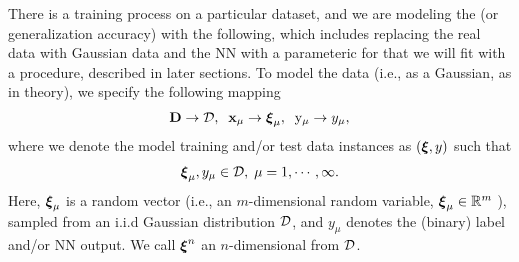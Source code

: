 There is a training process on a particular dataset, and we are modeling the \Quality (or generalization accuracy)
with the following, which includes replacing the real data with Gaussian data and
the NN with a parameteric for that we will fit with a \SemiEmpirical procedure, described in later sections.
To model the data (i.e., as a Gaussian, as in \SMOG theory), we specify the following mapping
\begin{align}
\label{eqn:model_real_world_expt}
  \mathbf{D} \rightarrow \mathcal{D},\;\;{\mathbf{x}}_{\mu} \rightarrow \boldsymbol{\xi}_{\mu},\;\;  \mathrm{y}_{\mu} \rightarrow y_{\mu}  ,
\end{align}
where we denote the model training and/or test data instances as $(\boldsymbol{\xi},y)$ such that
\begin{align}
    \label{eqn:xi}
  \boldsymbol{\xi}_{\mu}, y_{\mu} \in\mathcal{D},\;\mu=1, \cdots, \infty  .
\end{align}
Here,  $\boldsymbol{\xi}_{\mu}$ is a random vector (i.e., an $m$-dimensional random variable, $\boldsymbol{\xi}_{\mu}\in\mathbb{R}^{m}$ ),
sampled from an i.i.d Gaussian distribution $\mathcal{D}$,
and $y_{\mu}$ denotes the (binary) label and/or NN output.
We call $\boldsymbol{\xi}^{n}$ an $n$-dimensional \emph{\ModelSample} from $\mathcal{D}$.


